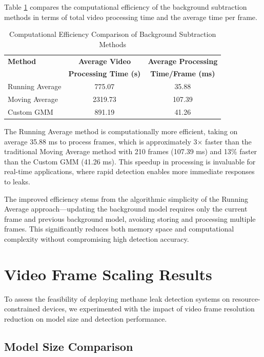 Table \ref{tab:processing_efficiency} compares the computational efficiency of the background subtraction methods in terms of total video processing time and the average time per frame.

\begin{table}[htbp]
\caption{Computational Efficiency Comparison of Background Subtraction Methods}
\label{tab:processing_efficiency}
\begin{tabular}{|l|c|c|}
\hline
\textbf{Method} & \textbf{Average Video} & \textbf{Average Processing} \\
& \textbf{Processing Time (s)} & \textbf{Time/Frame (ms)} \\
\hline
Running Average & 775.07 & 35.88 \\
Moving Average & 2319.73 & 107.39 \\
Custom GMM & 891.19 & 41.26 \\
\hline
\end{tabular}
\end{table}

The Running Average method is computationally more efficient, taking on average 35.88 ms to process frames, which is approximately 3× faster than the traditional Moving Average method with 210 frames (107.39 ms) and 13\% faster than the Custom GMM (41.26 ms). This speedup in processing is invaluable for real-time applications, where rapid detection enables more immediate responses to leaks.

The improved efficiency stems from the algorithmic simplicity of the Running Average approach—updating the background model requires only the current frame and previous background model, avoiding storing and processing multiple frames. This significantly reduces both memory space and computational complexity without compromising high detection accuracy.

\section{Video Frame Scaling Results}

To assess the feasibility of deploying methane leak detection systems on resource-constrained devices, we experimented with the impact of video frame resolution reduction on model size and detection performance.

\subsection{Model Size Comparison}


